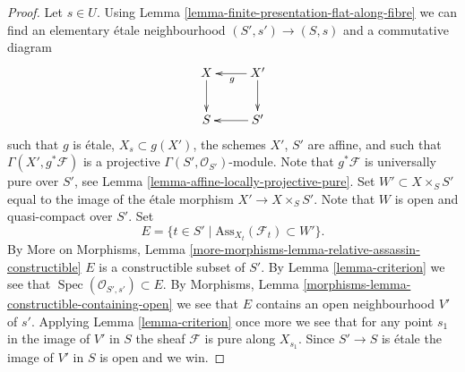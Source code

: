 \documentclass[10pt,a4paper]{amsart}
\theoremstyle{plain}
\theoremstyle{definition}
\theoremstyle{remark}
\numberwithin{equation}{subsection}
\def\Spec{\mathop{\mathrm{Spec}}}
\begin{document}
\begin{proof}
Let $s \in U$. Using
Lemma \ref{lemma-finite-presentation-flat-along-fibre}
we can find an elementary \'etale neighbourhood
$(S', s') \to (S, s)$ and a commutative diagram
$$
\xymatrix{
X \ar[d] & X' \ar[l]^g \ar[d] \\
S & S' \ar[l]
}
$$
such that $g$ is \'etale, $X_s \subset g(X')$, the schemes
$X'$, $S'$ are affine, and such that $\Gamma(X', g^*\mathcal{F})$
is a projective $\Gamma(S', \mathcal{O}_{S'})$-module.
Note that $g^*\mathcal{F}$ is universally pure over $S'$, see
Lemma \ref{lemma-affine-locally-projective-pure}.
Set $W' \subset X \times_S S'$ equal to the image of the \'etale morphism
$X' \to X \times_S S'$. Note that $W$ is open and quasi-compact over
$S'$. Set
$$
E = \{t \in S' \mid \text{Ass}_{X_t}(\mathcal{F}_t) \subset W' \}.
$$
By
More on Morphisms,
Lemma \ref{more-morphisms-lemma-relative-assassin-constructible}
$E$ is a constructible subset of $S'$. By
Lemma \ref{lemma-criterion}
we see that $\Spec(\mathcal{O}_{S', s'}) \subset E$.
By
Morphisms, Lemma \ref{morphisms-lemma-constructible-containing-open}
we see that $E$ contains an open neighbourhood $V'$ of $s'$.
Applying
Lemma \ref{lemma-criterion}
once more we see that for any point $s_1$ in the image of $V'$ in $S$
the sheaf $\mathcal{F}$ is pure along $X_{s_1}$. Since
$S' \to S$ is \'etale the image of $V'$ in $S$ is open and we win.
\end{proof}
\end{document}
